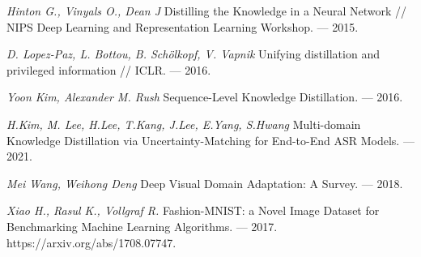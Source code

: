 \newpage


\begin{thebibliography}{99}
	\textit{Hinton G., Vinyals O., Dean J} Distilling the Knowledge in a Neural Network // NIPS Deep Learning and Representation Learning Workshop. — 2015.
    
    \textit{D. Lopez-Paz, L. Bottou, B. Schölkopf, V. Vapnik} Unifying distillation and privileged information // ICLR. — 2016.
	
	\textit{Yoon Kim, Alexander M. Rush} Sequence-Level Knowledge Distillation. — 2016.
	
	\textit{H.Kim, M. Lee, H.Lee, T.Kang, J.Lee, E.Yang, S.Hwang} Multi-domain Knowledge Distillation via Uncertainty-Matching for End-to-End ASR Models. — 2021.
	
	\textit{Mei Wang, Weihong Deng} Deep Visual Domain Adaptation: A Survey. — 2018.
	
    \textit{Xiao H., Rasul K., Vollgraf R.} Fashion-MNIST: a Novel Image Dataset for
    Benchmarking Machine Learning Algorithms. — 2017. https://arxiv.org/abs/1708.07747.
	
\end{thebibliography}
